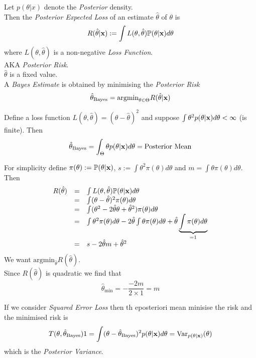 \documentclass[11pt,a4paper]{article}
\begin{document}

Let $p(\theta|x)$ denote the \textit{Posterior} density.\\
Then the \textit{Posterior Expected Loss} of an estimate $\hat\theta$ of $\theta$ is
$$R(\hat\theta|\textbf{x}):=\int L(\theta,\hat\theta)\mathbb{P}(\theta|\textbf{x})d\theta
$$
where $L(\theta,\hat\theta)$ is a non-negative \textit{Loss Function}.\\
\nb AKA \textit{Posterior Risk}.\\
\nb $\hat\theta$ is a fixed value.\\

A \textit{Bayes Estimate} is obtained by minimising the \textit{Posterior Risk}
$$\hat\theta_\text{Bayes}=\text{argmin}_{\theta\in\Theta}R(\hat\theta|\textbf{x})$$

Define a loss function $L(\theta,\hat\theta)=(\theta-\hat\theta)^2$ and suppose $\int\theta^2 p(\theta|\textbf{x})d\theta<\infty$ (\ie is finite). Then
$$\hat\theta_\text{Bayes}=\int_{\Theta}\theta p(\theta|\textbf{x})d\theta=\text{Posterior Mean}$$

For simplicity define $\pi(\theta):=\mathbb{P}(\theta|\textbf{x})$, $s:=\int\theta^2\pi(\theta)d\theta$ and $m=\int\theta\pi(\theta)d\theta$. Then
\[\begin{array}{rcl}
R(\hat\theta)&=&\int L(\theta,\hat\theta)\mathbb{P}(\theta|\textbf{x})d\theta\\
&=&\int(\theta-\hat\theta)^2\pi(\theta)d\theta\\
&=&\int(\theta^2-2\hat\theta\theta+\hat\theta^2)\pi(\theta)d\theta\\
&=&\int\theta^2\pi(\theta)d\theta-2\hat\theta\int\theta\pi(\theta)d\theta+\hat\theta\underbrace{\int\pi(\theta)d\theta}_{=1}\\
&=&s-2\hat\theta m+\hat\theta^2
\end{array}\]
We want $\text{argmin}_{\hat\theta}R(\hat\theta)$.\\
Since $R(\hat\theta)$ is quadratic we find that
$$\hat\theta_\text{min}=-\dfrac{-2m}{2\times 1}=m$$

\remark{}
If we consider \textit{Squared Error Loss} then th eposteriori mean minisise the risk and the minimised risk is
$$T(\theta,\hat\theta_\text{Bayes})1=\int(\theta-\hat\theta_\text{Bayes})^2p(\theta|\textbf{x})d\theta=\mathrm{Var}_{p(\theta|\textbf{x})}(\theta)$$
which is the \textit{Posterior Variance}.\\
\end{document}
